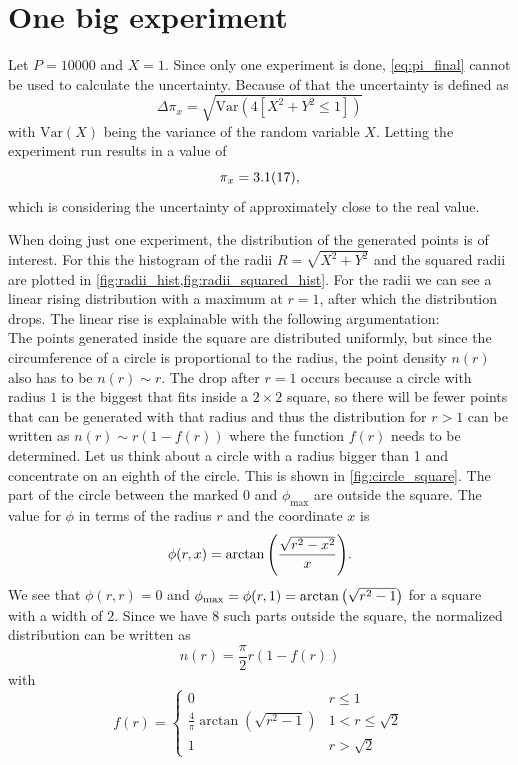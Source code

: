 \section{One big experiment}\label{sec:1}
Let $P = \num{10000}$ and $X = 1$. Since only one experiment is done,
\cref{eq:pi_final} cannot be used to calculate the uncertainty. Because of that
the uncertainty is defined as
\begin{equation}
	\Delta \pi_x = \sqrt{\text{Var}(4[X^2 + Y^2 \leq 1])}
    \label{eq:uncertainty_for_one_x}
\end{equation}
with $\text{Var}(X)$ being the variance of the random variable $X$.
Letting the experiment run results in a value of
\begin{equation}
	\pi_x = \num{3.1 \pm 1.7},
\end{equation}
which is considering the uncertainty of approximately  close to the real value.\par
%
When doing just one experiment, the distribution of the generated points is 
of interest. For this the histogram of the radii $R = \sqrt{X^2 + Y^2}$
and the squared radii are plotted in \cref{fig:radii_hist,fig:radii_squared_hist}.
For the radii we can see a linear rising distribution with a maximum at $r=1$, after which 
the distribution drops. 
The linear rise is explainable with the following argumentation:\\
The points generated inside the square are distributed uniformly, but since 
the circumference of a circle is proportional to the radius, the point density $n(r)$
also has to be $n(r)  \sim  r$. The drop after $r = 1$ occurs because 
a circle with radius $1$ is the biggest that fits inside a $2\times 2$ 
square, so there will be fewer points that can be generated with that radius and thus 
the distribution for $r > 1$ can be written as $n(r) \sim r(1-f(r))$ where 
the function $f(r)$ needs to be determined. 
Let us think about a circle with a radius bigger than 1 and concentrate on 
an eighth of the circle. This is shown in \cref{fig:circle_square}. 
The part of the circle between the marked 0 and $\phi_\text{max}$
are outside the square. The value for $\phi$ in terms of the radius $r$ and the coordinate 
$x$ is 
\[
    \phi(r, x) = \arctan\qty(\frac{\sqrt{r^2 - x^2}}{x}).
\]
We see that $\phi(r, r) = 0$ and $\phi_\text{max} = \phi(r, 1) = \arctan\qty(\sqrt{r^2 - 1})$
for a square with a width of $2$. 
Since we have 8 such parts outside the square, the normalized distribution can be 
written as 
\[
    n(r) = \frac \pi 2 r (1 - f(r))
\]
with 
\[
    f(r) = \begin{cases}
        0 & r \leq 1 \\
        \frac 4\pi \arctan(\sqrt{r^2 - 1}) & 1 < r \leq \sqrt{2} \\ 
        1 & r > \sqrt 2
    \end{cases}
\]
